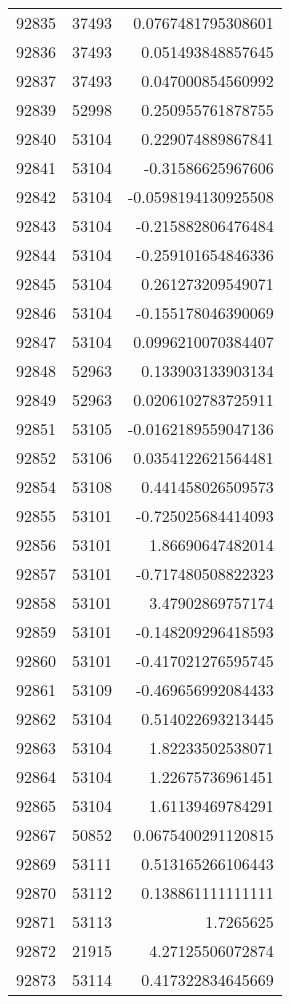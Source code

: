\begin{tabular}{r | r | r}
92835 & 37493 & 0.0767481795308601 \\
92836 & 37493 & 0.051493848857645 \\
92837 & 37493 & 0.047000854560992 \\
92839 & 52998 & 0.250955761878755 \\
92840 & 53104 & 0.229074889867841 \\
92841 & 53104 & -0.31586625967606 \\
92842 & 53104 & -0.0598194130925508 \\
92843 & 53104 & -0.215882806476484 \\
92844 & 53104 & -0.259101654846336 \\
92845 & 53104 & 0.261273209549071 \\
92846 & 53104 & -0.155178046390069 \\
92847 & 53104 & 0.0996210070384407 \\
92848 & 52963 & 0.133903133903134 \\
92849 & 52963 & 0.0206102783725911 \\
92851 & 53105 & -0.0162189559047136 \\
92852 & 53106 & 0.0354122621564481 \\
92854 & 53108 & 0.441458026509573 \\
92855 & 53101 & -0.725025684414093 \\
92856 & 53101 & 1.86690647482014 \\
92857 & 53101 & -0.717480508822323 \\
92858 & 53101 & 3.47902869757174 \\
92859 & 53101 & -0.148209296418593 \\
92860 & 53101 & -0.417021276595745 \\
92861 & 53109 & -0.469656992084433 \\
92862 & 53104 & 0.514022693213445 \\
92863 & 53104 & 1.82233502538071 \\
92864 & 53104 & 1.22675736961451 \\
92865 & 53104 & 1.61139469784291 \\
92867 & 50852 & 0.0675400291120815 \\
92869 & 53111 & 0.513165266106443 \\
92870 & 53112 & 0.138861111111111 \\
92871 & 53113 & 1.7265625 \\
92872 & 21915 & 4.27125506072874 \\
92873 & 53114 & 0.417322834645669 \\

\end{tabular}
